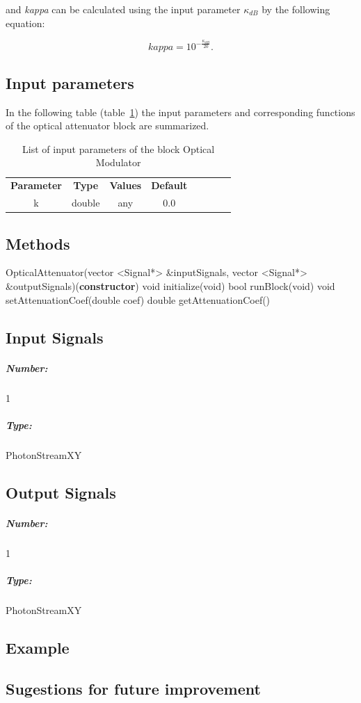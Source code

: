 and \textit{kappa} can be calculated using the input parameter $\kappa_{dB}$ by the following equation:

\begin{equation}\label{eq:kappa}
  \textit{kappa} = 10 ^{-\frac{\kappa_{dB}}{20}}.
\end{equation}


\subsection*{Input parameters}

 In the following table (table~\ref{table:sopmodulator_in_par}) the input parameters and corresponding functions of the optical attenuator block are summarized.

\begin{table}[h]
	\centering
	\begin{tabular}{|c|c|c|c|cccc}
		\cline{1-4}
		\textbf{Parameter} & \textbf{Type} & \textbf{Values} &   \textbf{Default}& \\ \cline{1-4}
		k & double & any & 0.0 \\ \cline{1-4}
	\end{tabular}
	\caption{List of input parameters of the block Optical Modulator}
	\label{table:sopmodulator_in_par}
\end{table}


\subsection*{Methods}


	OpticalAttenuator(vector <Signal*> \&inputSignals, vector <Signal*> \&outputSignals)(\textbf{constructor})
\bigbreak
	void initialize(void)
\bigbreak
	bool runBlock(void)
\bigbreak
	void setAttenuationCoef(double coef)
\bigbreak
	double getAttenuationCoef()
\bigbreak



\subsection*{Input Signals}

\subparagraph*{Number:} 1

\subparagraph*{Type:} PhotonStreamXY

\subsection*{Output Signals}

\subparagraph*{Number:} 1

\subparagraph*{Type:} PhotonStreamXY

\subsection*{Example}

\subsection*{Sugestions for future improvement}
